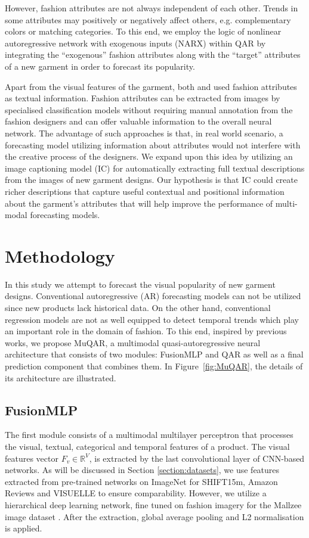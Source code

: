 \documentclass{article}
\begin{document}
However, fashion attributes are not always independent of each other. Trends in some attributes may positively or negatively affect others, e.g. complementary colors or matching categories. 
To this end, we employ the logic of nonlinear autoregressive network with exogenous inputs (NARX) \cite{billings2013nonlinear} within QAR by integrating the ``exogenous'' fashion attributes along with the ``target'' attributes of a new garment in order to forecast its popularity.

Apart from the visual features of the garment,
both \cite{ekambaram2020attention} and \cite{skenderi2021well} used fashion attributes as textual information. 
Fashion attributes can be extracted from images by specialised classification models without requiring manual annotation from the fashion designers and can offer valuable information to the overall neural network. 
The advantage of such approaches is that, in real world scenario, a forecasting model utilizing information about attributes would not interfere with the creative process of the designers.
We expand upon this idea by utilizing an image captioning model (IC) for automatically extracting full textual descriptions from the images of new garment designs. Our hypothesis is that IC could create richer descriptions that capture useful contextual and positional information about the garment's attributes that will help improve the performance of multi-modal forecasting models.

\section{Methodology}
\label{section:MuQAR}

In this study we attempt to forecast the visual popularity of new garment designs. Conventional autoregressive (AR) forecasting models can not be utilized since new products lack historical data. On the other hand, conventional regression models are not as well equipped to detect temporal trends which play an important role in the domain of fashion. 
To this end, inspired by previous works, we propose MuQAR, a multimodal quasi-autoregressive neural architecture that consists of two modules: FusionMLP and QAR as well as a final prediction component that combines them. In Figure~\ref{fig:MuQAR}, the details of its architecture are illustrated.

\subsection{FusionMLP}
The first module consists of a multimodal multilayer perceptron that processes the visual, textual, categorical and temporal features of a product. The visual features vector $F_v\in\mathbb{R}^V$, is extracted by the last convolutional layer of CNN-based networks. 
As will be discussed in Section \ref{section:datasets}, we use features extracted from pre-trained networks on ImageNet for SHIFT15m, Amazon Reviews and VISUELLE to ensure comparability. However, we utilize a hierarchical deep learning network, fine tuned on fashion imagery for the Mallzee image dataset \cite{papadopoulos2022attentive}.
After the extraction, global average pooling and L2 normalisation is applied. 
\end{document}
